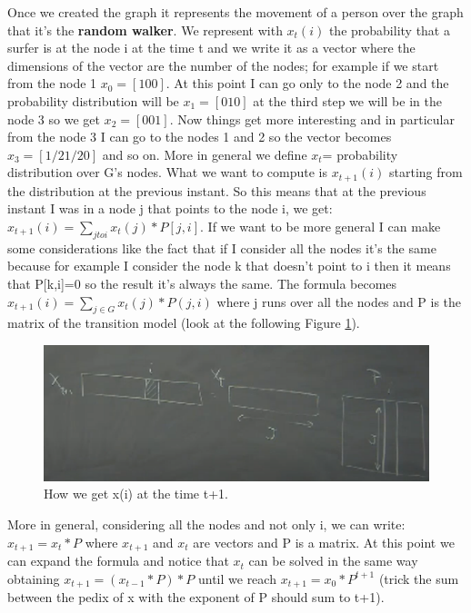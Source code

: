 Once we created the graph it represents the movement of a person over the graph that it's the \textbf{random walker}.\newline
We represent with $x_t(i)$ the probability that a surfer is at the node i at the time t and we write it as a vector where the dimensions of the vector are the number of the nodes; for example if we start from the node 1 $x_0=[100]$. At this point I can go only to the node 2 and the probability distribution will be $x_1=[010]$ at the third step we will be in the node 3 so we get $x_2=[001]$. Now things get more interesting and in particular from the node 3 I can go to the nodes 1 and 2 so the vector becomes $x_3=[1/2 1/2 0]$ and so on.\newline
More in general we define $x_t$= probability distribution over G's nodes.\newline
What we want to compute is $x_{t+1}(i)$ starting from the distribution at the previous instant. So this means that at the previous instant I was in a node j that points to the node i, we get: $x_{t+1}(i)=\sum_{j to i}x_t(j)*P[j,i]$.\newline
If we want to be more general I can make some considerations like the fact that if I consider all the nodes it's the same because for example I consider the node k that doesn't point to i then it means that P[k,i]=0 so the result it's always the same. The formula becomes $x_{t+1}(i)=\sum_{j \in G} x_t(j)*P(j,i)$ where j runs over all the nodes and P is the matrix of the transition model (look at the following Figure \ref{fig:transitionmodel}).\newline
\begin{figure}
    \centering
    \includegraphics[width=0.75\linewidth]{images/transitionmodel.png}
    \caption{How we get x(i) at the time t+1.}
    \label{fig:transitionmodel}
\end{figure}
More in general, considering all the nodes and not only i, we can write: $x_{t+1}=x_t*P$ where $x_{t+1}$ and $x_t$ are vectors and P is a matrix.\newline
At this point we can expand the formula and notice that $x_t$ can be solved in the same way obtaining $x_{t+1}=(x_{t-1}*P)*P$ until we reach $x_{t+1}=x_0*P^{t+1}$ (trick the sum between the pedix of x with the exponent of P should sum to t+1).\newline
